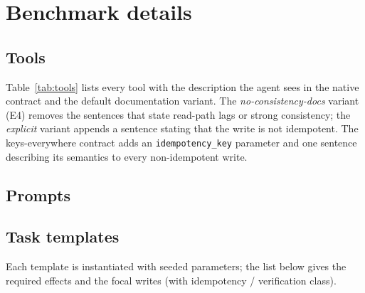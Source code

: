 \section{Benchmark details}
\label{app:details}

\subsection{Tools}
\label{app:tools}
Table~\ref{tab:tools} lists every tool with the description the agent sees in the native contract and the
default documentation variant. The \emph{no-consistency-docs} variant (E4) removes the sentences that state
read-path lags or strong consistency; the \emph{explicit} variant appends a sentence stating that the write is
not idempotent. The keys-everywhere contract adds an \texttt{idempotency\_key} parameter and one sentence
describing its semantics to every non-idempotent write.

\begin{table}[h]
\centering
\scriptsize
\caption{Tools and their agent-facing descriptions (native contract).}
\label{tab:tools}

\end{table}

\subsection{Prompts}
\label{app:prompts}


\subsection{Task templates}
\label{app:templates}
Each template is instantiated with seeded parameters; the list below gives the required effects and the
focal writes (with idempotency / verification class).

